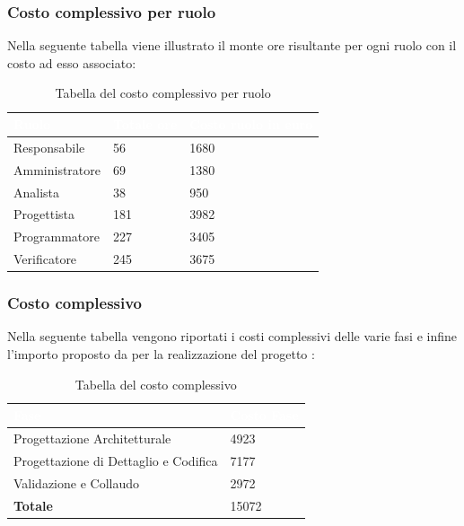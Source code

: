 \subsubsection{Costo complessivo per ruolo}
Nella seguente tabella viene illustrato il monte ore risultante per ogni ruolo con il costo ad esso associato:
{
	\renewcommand{\arraystretch}{2}

	\begin{longtable}{ C{3cm} C{2cm} C{4cm}}
	\caption{Tabella del costo complessivo per ruolo}\\
		\textcolor{white}{\textbf{Ruolo}} & 
		\textcolor{white}{\textbf{Totale ore}} & 
		\textcolor{white}{\textbf{Costo ruolo in euro}}\\	
	\endhead
        
        Responsabile & 56 &  1680\\
        Amministratore & 69 & 1380 \\
        Analista & 38 & 950 \\
        Progettista & 181 & 3982 \\
        Programmatore & 227 & 3405 \\
        Verificatore & 245 & 3675 \\
        	
	\end{longtable}

}

\subsubsection{Costo complessivo}
Nella seguente tabella vengono riportati i costi complessivi delle varie fasi e infine l'importo proposto da \Gruppo{} per la realizzazione del progetto \NomeProgetto{}:\\
{
	\renewcommand{\arraystretch}{2}

	
	\begin{longtable}{ C{5cm} C{5cm}}
	\caption{Tabella del costo complessivo}\\
		\textcolor{white}{\textbf{Fase}} &
		\textcolor{white}{\textbf{Costo Fase}}\\	
		\endhead
		
		Progettazione Architetturale & 4923 \\
		Progettazione di Dettaglio e Codifica & 7177 \\
		Validazione e Collaudo & 2972 \\
		\textbf{Totale} & 15072\\
		
	\end{longtable}

}



